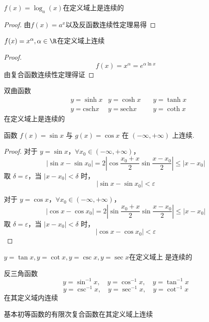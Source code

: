 \begin{corollary}
	$f(x)=\log_a(x)$在定义域上是连续的
\end{corollary}
\begin{proof}
	由$f(x)=a^x$以及反函数连续性定理易得
\end{proof}
\begin{corollary}
	$f(x)=x^{\alpha},\alpha\in\R$在定义域上连续
	
\end{corollary}
\begin{proof}
	$$f(x)=x^{\alpha	}=e^{\alpha\ln x}$$
	由复合函数连续性定理得证
	
\end{proof}
\begin{corollary}
	双曲函数$$\begin{aligned}
		&y=\sinh x &y=\cosh x \quad &y=\tanh x\\
		&y=\mathrm{csch}x &y=\mathrm{sech}x\quad&y=\coth x
	\end{aligned}$$在定义域上是连续的
\end{corollary}
\begin{proposition}
	函数 $f(x) = \sin x$ 与 $g(x) = \cos x$ 在 $(-\infty, +\infty)$ 上连续.
\end{proposition}
\begin{proof}
	对于 $y = \sin x$，$\forall x_0 \in (-\infty, +\infty)$，
	\[
	|\sin x - \sin x_0| = 2 \left|\cos \frac{x_0 + x}{2} \sin \frac{x - x_0}{2}\right| \leqslant |x - x_0|
	\]
	取 $\delta = \varepsilon$，当 $|x - x_0| < \delta$ 时，
	\[
	|\sin x - \sin x_0| < \varepsilon
	\]
	
	对于 $y = \cos x$，$\forall x_0 \in (-\infty, +\infty)$，
	\[
	|\cos x - \cos x_0| = 2 \left|\sin \frac{x_0 + x}{2} \sin \frac{x - x_0}{2}\right| \leqslant |x - x_0|
	\]
	取 $\delta = \varepsilon$，当 $|x - x_0| < \delta$ 时，
	\[
	|\cos x - \cos x_0| < \varepsilon
	\]
	
\end{proof}
\begin{corollary}
	$y=\tan x,y=\cot x,y=\csc x,y=\sec x$在定义域上 是连续的
\end{corollary}

\begin{corollary}
	反三角函数
	\[ y = \sin^{-1} x, \quad y = \cos^{-1} x, \quad y = \tan^{-1} x \]
	\[ y = \csc^{-1} x, \quad y = \sec^{-1} x, \quad y = \cot^{-1} x \]
	在其定义域内连续
\end{corollary}
\begin{corollary}
	基本初等函数的有限次复合函数在其定义域上连续	
\end{corollary}
